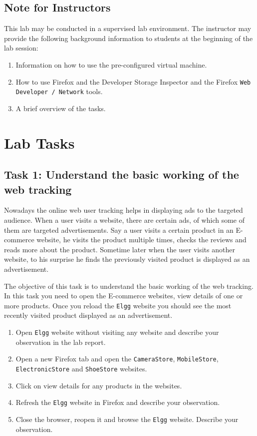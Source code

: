 \subsection{Note for Instructors} 

This lab may be conducted in a
supervised lab environment. The instructor may provide the following
background information to students at the beginning of the lab session:
\begin{enumerate}
  \item Information on how to use the pre-configured virtual machine.
  \item How to use Firefox and the Developer Storage Inspector and
the Firefox {\tt Web Developer / Network} tools.
  \item A brief overview of the tasks.
       
\end{enumerate}


\section{Lab Tasks}


\subsection{Task 1: Understand the basic working of the web tracking}

Nowadays the online web user tracking helps in displaying ads to the targeted audience. 
When a user visits a website, there are certain ads, of which some of them are targeted advertisements. 
Say a user visits a certain product in an E-commerce website, he visits the product multiple times, checks the reviews and reads more about the product.
Sometime later when the user visits another website, to his surprise he finds the previously visited product is displayed as an advertisement.

The objective of this task is to understand the basic working of the web tracking. 
In this task you need to open the E-commerce websites, view details of one or more products. 
Once you reload the {\tt Elgg} website you should see the most recently visited product displayed as an advertisement. 


\begin{enumerate}
  \item Open {\tt Elgg} website without visiting any website and describe your observation in the lab report.
  \item Open a new Firefox tab and open the {\tt CameraStore}, {\tt MobileStore}, {\tt ElectronicStore} and {\tt ShoeStore} websites.
  \item Click on view details for any products in the websites.
  \item Refresh the {\tt Elgg} website in Firefox and describe your observation.
  \item Close the browser, reopen it and browse the {\tt Elgg} website. Describe your observation.       
\end{enumerate}


